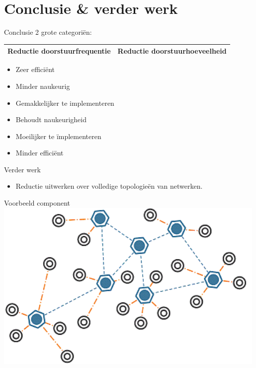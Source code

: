 \documentclass[presentation, bigger]{beamer}
\begin{document}
\section{Conclusie \& verder werk}
\begin{frame}{Conclusie}
  2 grote categoriën:
  \vspace{1cm}
  \begin{tabular}{ p{5.5cm}  p{5.5cm} }
    \toprule
    Reductie doorstuurfrequentie & Reductie doorstuurhoeveelheid   \\ 
    \toprule
  \end{tabular}    

  \begin{minipage}{.5\textwidth}
    \begin{itemize}
    \item Zeer efficiënt
    \item Minder naukeurig
    \item Gemakkelijker te implementeren
    \end{itemize}
    
  \end{minipage}%
  \begin{minipage}{.5\textwidth}
    \begin{itemize}
    \item Behoudt naukeurigheid
    \item Moeilijker te ïmplementeren
    \item Minder efficiënt
    \end{itemize}
  \end{minipage}
  \vspace{2cm}
  \hspace{2.5cm}
\end{frame}

\begin{frame}{Verder werk}
  \begin{itemize}
  \item Reductie uitwerken over volledige topologieën van netwerken.
  \end{itemize}
\end{frame}
\begin{frame}{Voorbeeld component}
\includegraphics[width=0.99\textwidth,keepaspectration=true]{wsn}
\end{frame}
\end{document}
